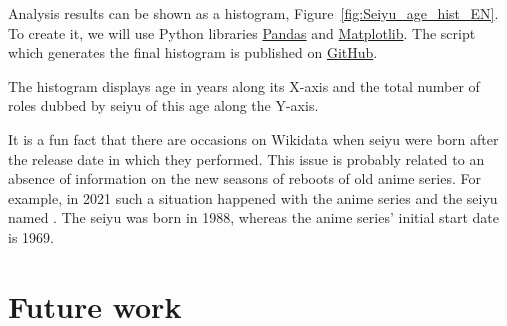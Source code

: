 \begin{figure*}[h]

    \setlength{\fboxsep}{0pt}%
    \setlength{\fboxrule}{1pt}%
	\caption[Histogram of number of anime voiced by seiyu of different ages, 2021.]{Histogram of number of anime voiced by seiyu of different ages, 2021. The histogram was created according to the output of queries~\protect\ref{lst:seiyu_bd_w_service} (or~\protect\ref{lst:seiyu_bd_w_rdfs}), \protect\ref{lst:all_anime_releases} and \protect\ref{lst:link_anime_seiyu}.}%
    \label{fig:Seiyu_age_hist_EN}%
\end{figure*} 


Analysis results can be shown as a histogram, Figure~\ref{fig:Seiyu_age_hist_EN}. To create it, we will use Python libraries \href{https://en.wikipedia.org/wiki/Pandas\_(software)}{Pandas} and \href{https://en.wikipedia.org/wiki/Matplotlib}{Matplotlib}. The script which generates the final histogram is published on \href{https://git.io/J1UGA}{GitHub}.

The histogram displays age in years along its X-axis and the total number of roles dubbed by seiyu of this age along the Y-axis.

It is a fun fact that there are occasions on Wikidata when seiyu were born after the release date in which they performed. This issue is probably related to an absence of information on the new seasons of reboots of old anime series. For example, in 2021 such a situation happened with the anime series  and the seiyu named . The seiyu was born in 1988, whereas the anime series’ initial start date is 1969.

\section{Future work}

